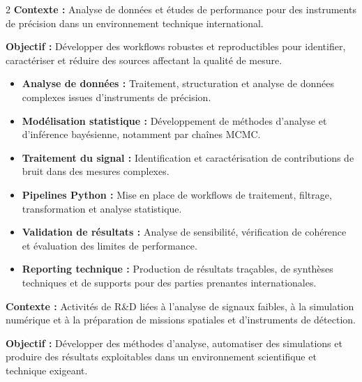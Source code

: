 \documentclass[8pt,a4paper,ragged2e,withhyper]{../_shared/altacv}
\begin{document}
\begin{paracol}{2}
\textbf{Contexte :} Analyse de données et études de performance pour des instruments de précision dans un environnement technique international.

\textbf{Objectif :} Développer des workflows robustes et reproductibles pour identifier, caractériser et réduire des sources affectant la qualité de mesure.

\begin{itemize}
  \item \textbf{Analyse de données :} Traitement, structuration et analyse de données complexes issues d'instruments de précision.
  \item \textbf{Modélisation statistique :} Développement de méthodes d'analyse et d'inférence bayésienne, notamment par chaînes MCMC.
  \item \textbf{Traitement du signal :} Identification et caractérisation de contributions de bruit dans des mesures complexes.
  \item \textbf{Pipelines Python :} Mise en place de workflows de traitement, filtrage, transformation et analyse statistique.
  \item \textbf{Validation de résultats :} Analyse de sensibilité, vérification de cohérence et évaluation des limites de performance.
  \item \textbf{Reporting technique :} Production de résultats traçables, de synthèses techniques et de supports pour des parties prenantes internationales.
\end{itemize}

\divider


\textbf{Contexte :} Activités de R\&D liées à l'analyse de signaux faibles, à la simulation numérique et à la préparation de missions spatiales et d'instruments de détection.

\textbf{Objectif :} Développer des méthodes d'analyse, automatiser des simulations et produire des résultats exploitables dans un environnement scientifique et technique exigeant.


\end{paracol}
\end{document}
